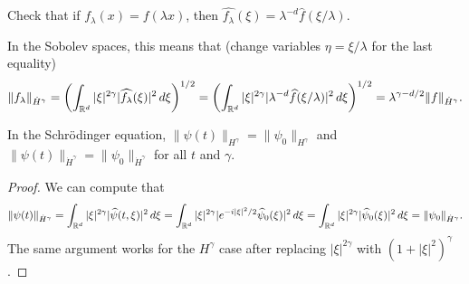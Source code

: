 \begin{exercise}
  Check that if $f_\lambda(x) = f(\lambda x)$, then
  $\widehat{f_\lambda}(\xi) = \lambda^{-d} \widehat{f}(\xi / \lambda)$.
\end{exercise}

\begin{remark}
  In the Sobolev spaces, this means that (change
  variables $\eta = \xi / \lambda$ for the last equality)
  \[
    \|f_\lambda\|_{\dot{H}^{\gamma}}
    = \left(\int_{\mathbb{R}^d} |\xi|^{2\gamma} |\widehat{f_\lambda}(\xi)|^2\, d\xi\right)^{1 / 2}
    = \left(\int_{\mathbb{R}^d} |\xi|^{2\gamma} |\lambda^{-d} \widehat{f}(\xi / \lambda)|^2\, d\xi\right)^{1 / 2}
    = \lambda^{\gamma - d / 2} \|f\|_{\dot{H}^{\gamma}}.
  \]
\end{remark}

\begin{lemma}
  In the Schr\"odinger equation, $\|\psi(t)\|_{H^{\gamma}} = \|\psi_0\|_{H^{\gamma}}$
  and $\|\psi(t)\|_{\dot{H}^{\gamma}} = \|\psi_0\|_{\dot{H}^{\gamma}}$
  for all $t$ and $\gamma$.
\end{lemma}

\begin{proof}
  We can compute that
  \[
    \|\psi(t)\|_{\dot{H}^{\gamma}}
    = \int_{\mathbb{R}^d} |\xi|^{2\gamma} |\widehat{\psi}(t, \xi)|^2\, d\xi
    = \int_{\mathbb{R}^d} |\xi|^{2\gamma} |e^{-i |\xi|^2 / 2}\widehat{\psi}_0(\xi)|^2\, d\xi
    = \int_{\mathbb{R}^d} |\xi|^{2\gamma} |\widehat{\psi}_0(\xi)|^2\, d\xi
    = \|\psi_0\|_{\dot{H}^{\gamma}}.
  \]
  The same argument works for the $H^{\gamma}$ case
  after replacing $|\xi|^{2\gamma}$ with
  $(1 + |\xi|^2)^\gamma$.
\end{proof}
